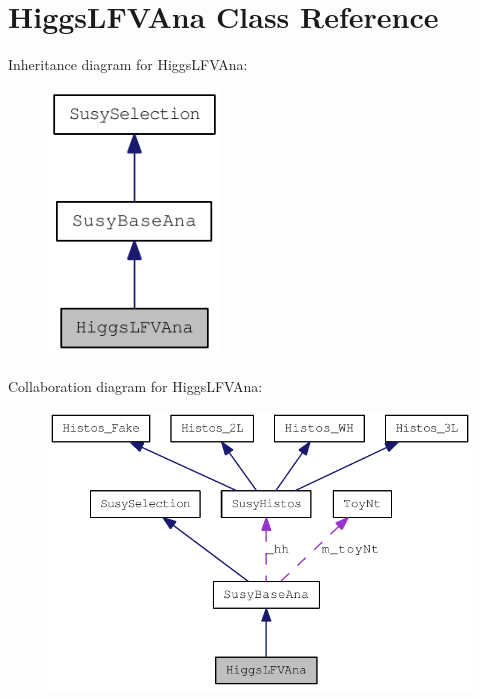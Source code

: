 \hypertarget{classHiggsLFVAna}{
\section{HiggsLFVAna Class Reference}
\label{classHiggsLFVAna}
}
Inheritance diagram for HiggsLFVAna:\nopagebreak
\begin{figure}[H]
\begin{center}
\leavevmode
\includegraphics[width=130pt]{classHiggsLFVAna__inherit__graph}
\end{center}
\end{figure}
Collaboration diagram for HiggsLFVAna:\nopagebreak
\begin{figure}[H]
\begin{center}
\leavevmode
\includegraphics[width=372pt]{classHiggsLFVAna__coll__graph}
\end{center}
\end{figure}
